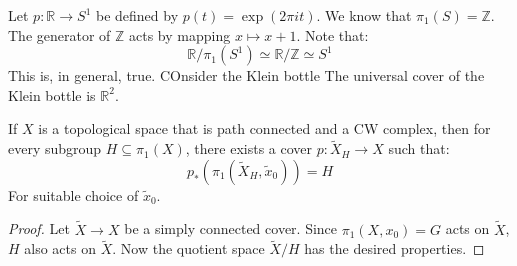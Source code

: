 \documentclass{book}                                                           %
\begin{document}
            \begin{example}
                Let $p:\mathbb{R}\rightarrow{S}^{1}$ be defined by
                $p(t)=\exp(2\pi{i}t)$. We know that
                $\pi_{1}(S)=\mathbb{Z}$. The generator of
                $\mathbb{Z}$ acts by mapping
                $x\mapsto{x}+1$. Note that:
                \begin{equation}
                    \mathbb{R}/\pi_{1}(S^{1})\simeq
                    \mathbb{R}/\mathbb{Z}\simeq
                    S^{1}
                \end{equation}
                This is, in general, true. COnsider the Klein bottle
                The universal cover of the Klein bottle is
                $\mathbb{R}^{2}$. 
            \end{example}
            \begin{theorem}
                If $X$ is a topological space that is path connected
                and a CW complex, then for every subgroup
                $H\subseteq\pi_{1}(X)$, there exists a cover
                $p:\tilde{X}_{H}\rightarrow{X}$ such that:
                \begin{equation}
                    p_{*}(\pi_{1}(\tilde{X}_{H},\tilde{x}_{0}))=H
                \end{equation}
                For suitable choice of $\tilde{x}_{0}$.
            \end{theorem}
            \begin{proof}
                Let $\tilde{X}\rightarrow{X}$ be a simply
                connected cover. Since $\pi_{1}(X,x_{0})=G$ acts on
                $\tilde{X}$, $H$ also acts on $\tilde{X}$. Now the
                quotient space $\tilde{X}/H$ has the desired
                properties.
            \end{proof}
\end{document}
